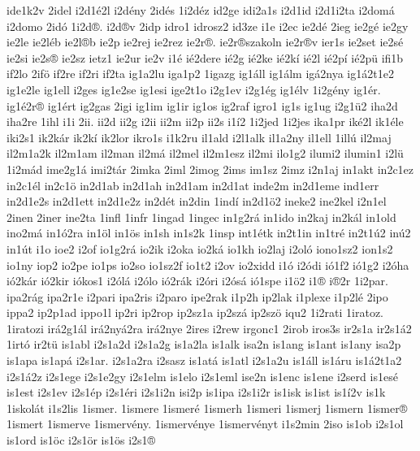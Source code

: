 {ide1k2v
2idel
i2d1^^e92l
i2d^^e9ny
2id^^e9s
1i2d^^e9z
id2ge
idi2a1s
i2d1id
i2d1i2ta
i2dom^^e1
i2domo
2id^^f3
1i2d^^ae.
i2d^^aev
2idp
idro1
idrosz2
id3ze
i1e
i2ec
ie2d^^e9
2ieg
ie2g^^e9
ie2gy
ie2le
ie2l^^e9b
ie2l^^aeb
ie2p
ie2rej
ie2rez
ie2r^^ae.
ie2r^^aeszakoln
ie2r^^aev
ier1s
ie2set
ie2s^^e9
ie2si
ie2s^^ae
ie2sz
ietz1
ie2ur
ie2v
i1^^e9
i^^e92dere
i^^e92g
i^^e92ke
i^^e92k^^ed
i^^e92l
i^^e92p^^ed
i^^e92p^^fc
ifi1b
if2lo
2if^^f6
if2re
if2ri
if2ta
ig1a2lu
iga1p2
1igazg
ig1^^e1ll
ig1^^e1lm
ig^^e12nya
ig1^^e12t1e2
ig1e2le
ig1ell
i2ges
ig1e2se
ig1esi
ige2t1o
i2g1ev
i2g1^^e9g
ig1^^e9lv
1i2g^^e9ny
ig1^^e9r.
ig1^^e92r^^ae
ig1^^e9rt
ig2gas
2igi
ig1im
ig1ir
ig1os
ig2raf
igro1
ig1s
ig1ug
i2g1^^fc2
iha2d
iha2re
1ihl
i1i
2ii.
ii2d
ii2g
i2ii
ii2m
ii2p
ii2s
i1^^ed2
1i2jed
1i2jes
ika1pr
ik^^e92l
ik1^^e9le
iki2s1
ik2k^^e1r
ik2k^^ed
ik2lor
ikro1s
i1k2ru
il1ald
i2l1alk
il1a2ny
il1ell
1ill^^fa
il2maj
il2m1a2k
il2m1am
il2man
il2m^^e1
il2mel
il2m1esz
il2mi
ilo1g2
ilumi2
ilumin1
i2l^^fc
1i2m^^e1d
ime2g1^^e1
imi2t^^e1r
2imka
2iml
2imog
2ims
im1sz
2imz
i2n1aj
in1akt
in2c1ez
in2c1^^e9l
in2c1^^f6
in2d1ab
in2d1ah
in2d1am
in2d1at
inde2m
in2d1eme
ind1err
in2d1e2s
in2d1ett
in2d1e2z
in2d^^e9t
in2din
1ind^^ed
in2d1^^f62
ineke2
ine2kel
i2n1el
2inen
2iner
ine2ta
1infl
1infr
1ingad
1ingec
in1g2r^^e1
in1ido
in2kaj
in2k^^e1l
in1old
ino2m^^e1
in1^^f32ra
in1^^f6l
in1^^f6s
in1sh
in1s2k
1insp
int1^^e9tk
in2t1in
in1tr^^e9
in2t1^^fa2
in^^fa2
in1^^fat
i1o
ioe2
i2of
io1g2r^^e1
io2ik
i2oka
io2k^^e1
io1kh
io2laj
i2ol^^f3
iono1sz2
ion1s2
io1ny
iop2
io2pe
io1ps
io2so
io1sz2f
io1t2
i2ov
io2xidd
i1^^f3
i2^^f3di
i^^f31f2
i^^f31g2
i2^^f3ha
i^^f32k^^e1r
i^^f32kir
i^^f3kos1
i2^^f3l^^e1
i2^^f3lo
i^^f32r^^e1k
i2^^f3ri
i2^^f3s^^e1
i^^f31spe
i1^^f62
i1^^ae
i^^ae2r
1i2par.
ipa2r^^e1g
ipa2r1e
i2pari
ipa2ris
i2paro
ipe2rak
i1p2h
ip2lak
i1plexe
i1p2l^^e9
2ipo
ippa2
ip2p1ad
ippo1l
ip2ri
ip2rop
ip2sz1a
ip2sz^^e1
ip2sz^^f6
iqu2
1i2rati
1iratoz.
1iratozi
ir^^e12g1^^e1l
ir^^e12ny^^e12ra
ir^^e12nye
2ires
i2rew
irgonc1
2irob
iros3s
ir2s1a
ir2s1^^e12
1irt^^f3
ir2t^^fc
is1abl
i2s1a2d
i2s1a2g
is1a2la
is1alk
isa2n
is1ang
is1ant
is1any
isa2p
is1apa
is1ap^^e1
i2s1ar.
i2s1a2ra
i2sasz
is1at^^e1
is1atl
i2s1a2u
is1^^e1ll
is1^^e1ru
is1^^e12t1a2
i2s1^^e12z
i2s1ege
i2s1e2gy
i2s1elm
is1elo
i2s1eml
ise2n
is1enc
is1ene
i2serd
is1es^^e9
is1est
i2s1ev
i2s1^^e9p
i2s1^^e9ri
i2s1i2n
isi2p
is1ipa
i2s1i2r
is1isk
is1ist
is1^^ed2v
is1k
1iskol^^e1t
i1s2lis
1ismer.
1ismere
1ismer^^e9
1ismerh
1ismeri
1ismerj
1ismern
1ismer^^ae
1ismert
1ismerve
1ismerv^^e9ny.
1ismerv^^e9nye
1ismerv^^e9nyt
i1s2min
2iso
is1ob
i2s1ol
is1ord
is1^^f6c
i2s1^^f6r
is1^^f6s
i2s1^^ae
}
